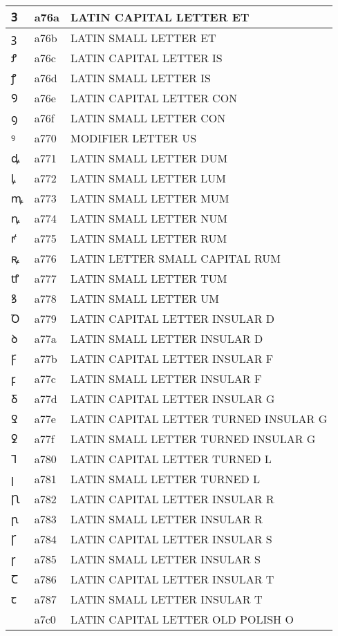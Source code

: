 \documentclass[12pt,letterpaper,openany]{book}
\begin{document}
\begin{center}
\begin{supertabular}{|m{0.25in}|m{0.5in}|m{4in}|}
Ꝫ & a76a & LATIN CAPITAL LETTER ET\\\hline
ꝫ & a76b & LATIN SMALL LETTER ET\\\hline
Ꝭ & a76c & LATIN CAPITAL LETTER IS\\\hline
ꝭ & a76d & LATIN SMALL LETTER IS\\\hline
Ꝯ & a76e & LATIN CAPITAL LETTER CON\\\hline
ꝯ & a76f & LATIN SMALL LETTER CON\\\hline
ꝰ & a770 & MODIFIER LETTER US\\\hline
ꝱ & a771 & LATIN SMALL LETTER DUM\\\hline
ꝲ & a772 & LATIN SMALL LETTER LUM\\\hline
ꝳ & a773 & LATIN SMALL LETTER MUM\\\hline
ꝴ & a774 & LATIN SMALL LETTER NUM\\\hline
ꝵ & a775 & LATIN SMALL LETTER RUM\\\hline
ꝶ & a776 & LATIN LETTER SMALL CAPITAL RUM\\\hline
ꝷ & a777 & LATIN SMALL LETTER TUM\\\hline
ꝸ & a778 & LATIN SMALL LETTER UM\\\hline
Ꝺ & a779 & LATIN CAPITAL LETTER INSULAR D\\\hline
ꝺ & a77a & LATIN SMALL LETTER INSULAR D\\\hline
Ꝼ & a77b & LATIN CAPITAL LETTER INSULAR F\\\hline
ꝼ & a77c & LATIN SMALL LETTER INSULAR F\\\hline
Ᵹ & a77d & LATIN CAPITAL LETTER INSULAR G\\\hline
Ꝿ & a77e & LATIN CAPITAL LETTER TURNED INSULAR G\\\hline
ꝿ & a77f & LATIN SMALL LETTER TURNED INSULAR G\\\hline
Ꞁ & a780 & LATIN CAPITAL LETTER TURNED L\\\hline
ꞁ & a781 & LATIN SMALL LETTER TURNED L\\\hline
Ꞃ & a782 & LATIN CAPITAL LETTER INSULAR R\\\hline
ꞃ & a783 & LATIN SMALL LETTER INSULAR R\\\hline
Ꞅ & a784 & LATIN CAPITAL LETTER INSULAR S\\\hline
ꞅ & a785 & LATIN SMALL LETTER INSULAR S\\\hline
Ꞇ & a786 & LATIN CAPITAL LETTER INSULAR T\\\hline
ꞇ & a787 & LATIN SMALL LETTER INSULAR T\\\hline
Ꟁ & a7c0 & LATIN CAPITAL LETTER OLD POLISH O\\\hline

\end{supertabular}
\end{center}
\end{document}
